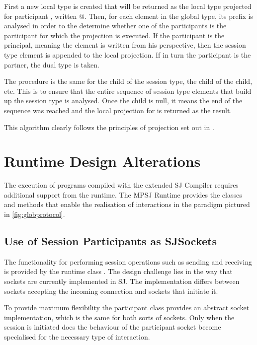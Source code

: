 First a new local type is created that will be returned as the local type projected for participant , written @. Then, for each element in the global type, its prefix is analysed in order to the determine whether one of the participants is the participant for which the projection is executed. If the participant is the principal, meaning the element is written from his perspective, then the session type element is appended to the local projection. If in turn the participant is the partner, the dual type is taken. 

The procedure is the same for the child of the session type, the child of the child, etc. This is to ensure that the entire sequence of session type elements that build up the session type is analysed. Once the child is null, it means the end of the sequence was reached and the local projection for  is returned as the result.

This algorithm clearly follows the principles of projection set out in \cite{multiparty_sess_types}.  


\section{Runtime Design Alterations}

The execution of programs compiled with the extended SJ Compiler requires additional support from the runtime. The MPSJ Runtime provides the classes and methods that enable the realisation of interactions in the paradigm pictured in \autoref{fig:globprotocol}.

\subsection{Use of Session Participants as SJSockets}

The functionality for performing session operations such as sending and receiving is provided by the runtime class . The design challenge lies in the way that sockets are currently implemented in SJ. The implementation differs between sockets accepting the incoming connection and sockets that initiate it.

To provide maximum flexibility the participant class provides an abstract socket implementation, which is the same for both sorts of sockets. Only when the session is initiated does the behaviour of the participant socket become specialised for the necessary type of interaction. 

